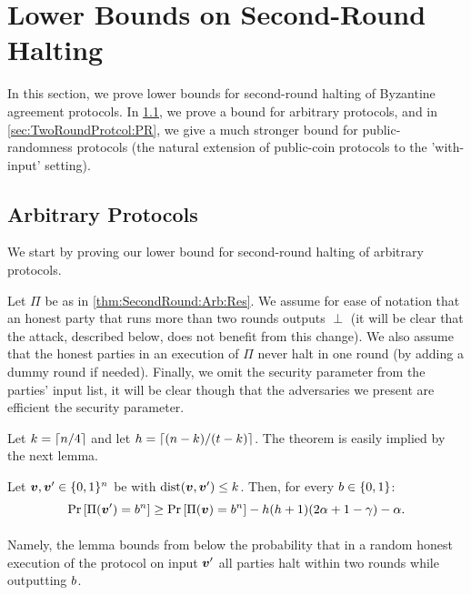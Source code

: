 \newcommand{\DF}{D_\F}
\newcommand{\SDF}{\Supp(D_\F)}


\section{Lower Bounds on Second-Round Halting}\label{sec:SecondRound}
In this section, we prove lower bounds for second-round halting of Byzantine agreement protocols. In \cref{sec:TwoRoundProtcol:Arbitrary}, we prove a bound for arbitrary protocols, and in \cref{sec:TwoRoundProtcol:PR}, we give a much stronger bound for public-randomness protocols (the natural extension of public-coin protocols to the 'with-input' setting).

\subsection{Arbitrary Protocols}\label{sec:TwoRoundProtcol:Arbitrary}
We start by proving our lower bound for second-round halting of arbitrary protocols.

\begin{theorem}\label{thm:SecondRound:Arb:Res}
\ThmSecondRoundArb
\end{theorem}

Let $\Pi$ be as in \cref{thm:SecondRound:Arb:Res}. We assume for ease of notation that an honest party that runs more than two rounds outputs $\perp$ (it will be clear that the attack, described below, does not benefit from this change). We also assume \wlg that the honest parties in an execution of $\Pi$ never halt in one round (by adding a dummy round if needed). Finally, we omit the security parameter from the parties' input list, it will be clear though that the adversaries we present are efficient \wrt the security parameter.

Let $k =\left\lceil n/4 \right\rceil$ and let $h = \left\lceil (n-k)/(t-k) \right\rceil$. The theorem is easily implied by the next lemma.

\begin{lemma}\label{lemma:SecondRound:Arb}
Let ${ \boldsymbol{v}},{ \boldsymbol{v}}' \in {\{0,1\}^n}$ be with $\mathrm{dist}({ \boldsymbol{v}},{ \boldsymbol{v}}') \le k$. Then, for every $b\in \{0,1\}$:
\[
\Pr_{}\left[\Pi({ \boldsymbol{v}}') = b^n\right] \ge \Pr_{}\left[\Pi({ \boldsymbol{v}}) = b^n\right] - h(h+1)(2\alpha + 1-\gamma) - \alpha.
\]
\end{lemma}
Namely, the lemma bounds from below the probability that in a random honest execution of the protocol on input ${ \boldsymbol{v}}'$ all parties halt within two rounds while outputting $b$.

